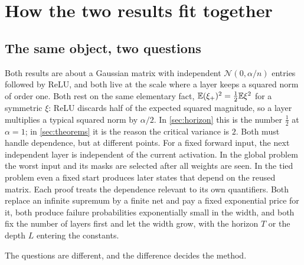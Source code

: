\section{How the two results fit together}
\label{sec:together}

\subsection{The same object, two questions}

Both results are about a Gaussian matrix with independent $\mathcal N(0,\alpha/n)$ entries followed by ReLU, and both live at the scale where a layer keeps a squared norm of order one. Both rest on the same elementary fact, $\mathbb{E}(\xi_+)^2=\tfrac12\mathbb{E}\xi^2$ for a symmetric $\xi$: ReLU discards half of the expected squared magnitude, so a layer multiplies a typical squared norm by $\alpha/2$. In \cref{sec:horizon} this is the number $\tfrac12$ at $\alpha=1$; in \cref{sec:theorems} it is the reason the critical variance is $2$. Both must handle dependence, but at different points. For a fixed forward input, the next independent layer is independent of the current activation. In the global problem the worst input and its masks are selected after all weights are seen. In the tied problem even a fixed start produces later states that depend on the reused matrix. Each proof treats the dependence relevant to its own quantifiers. Both replace an infinite supremum by a finite net and pay a fixed exponential price for it, both produce failure probabilities exponentially small in the width, and both fix the number of layers first and let the width grow, with the horizon $T$ or the depth $L$ entering the constants.

The questions are different, and the difference decides the method.

